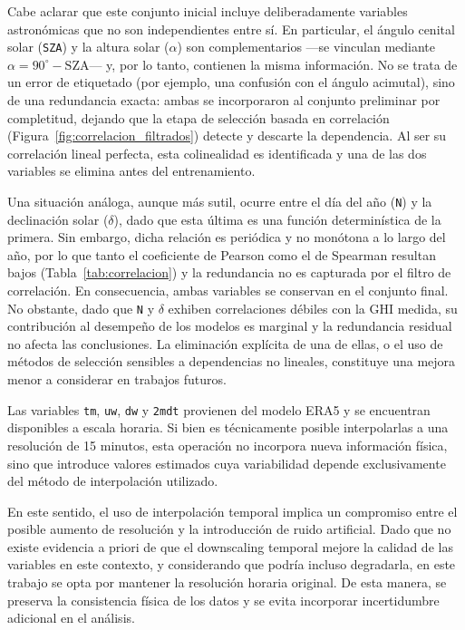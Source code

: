 Cabe aclarar que este conjunto inicial incluye deliberadamente variables
astronómicas que no son independientes entre sí. En particular, el ángulo
cenital solar (\texttt{SZA}) y la altura solar (\texttt{$\alpha$}) son
complementarios —se vinculan mediante $\alpha = 90^\circ - \mathrm{SZA}$— y,
por lo tanto, contienen la misma información. No se trata de un error de
etiquetado (por ejemplo, una confusión con el ángulo acimutal), sino de una
redundancia exacta: ambas se incorporaron al conjunto preliminar por
completitud, dejando que la etapa de selección basada en correlación
(Figura~\ref{fig:correlacion_filtrados}) detecte y descarte la dependencia.
Al ser su correlación lineal perfecta, esta colinealidad es identificada y
una de las dos variables se elimina antes del entrenamiento.

Una situación análoga, aunque más sutil, ocurre entre el día del año
(\texttt{N}) y la declinación solar ($\delta$), dado que esta última es una
función determinística de la primera. Sin embargo, dicha relación es
periódica y no monótona a lo largo del año, por lo que tanto el coeficiente
de Pearson como el de Spearman resultan bajos (Tabla~\ref{tab:correlacion}) y
la redundancia no es capturada por el filtro de correlación. En
consecuencia, ambas variables se conservan en el conjunto final. No obstante,
dado que \texttt{N} y $\delta$ exhiben correlaciones débiles con la GHI
medida, su contribución al desempeño de los modelos es marginal y la
redundancia residual no afecta las conclusiones. La eliminación explícita de
una de ellas, o el uso de métodos de selección sensibles a dependencias no
lineales, constituye una mejora menor a considerar en trabajos futuros.

Las variables \texttt{tm}, \texttt{uw}, \texttt{dw} y \texttt{2mdt} provienen del modelo ERA5 y se encuentran disponibles a escala horaria. Si bien es técnicamente posible interpolarlas a una resolución de 15 minutos, esta operación no incorpora nueva información física, sino que introduce valores estimados cuya variabilidad depende exclusivamente del método de interpolación utilizado.

En este sentido, el uso de interpolación temporal implica un compromiso entre el posible aumento de resolución y la introducción de ruido artificial. Dado que no existe evidencia a priori de que el downscaling temporal mejore la calidad de las variables en este contexto, y considerando que podría incluso degradarla, en este trabajo se opta por mantener la resolución horaria original. De esta manera, se preserva la consistencia física de los datos y se evita incorporar incertidumbre adicional en el análisis.

